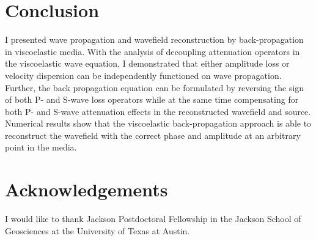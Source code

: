 \section{Conclusion}
I presented wave propagation and wavefield reconstruction by back-propagation in viscoelastic media. With the analysis of decoupling attenuation operators in the viscoelastic wave equation, I demonstrated that either amplitude loss or velocity dispersion can be independently functioned on wave propagation. Further, the back propagation equation can be formulated by reversing the sign of both P- and S-wave loss operators while at the same time compensating for both P- and S-wave attenuation effects in the reconstructed wavefield and source. Numerical results show that the viscoelastic back-propagation approach is able to reconstruct the wavefield with the correct phase and amplitude at an arbitrary point in the media. 

\section{Acknowledgements}
I would like to thank Jackson Postdoctoral Fellowship in the Jackson School of Geosciences at the University of Texas at Austin.


\onecolumn




